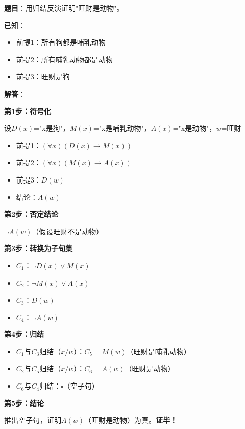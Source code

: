 \begin{examplebox}
\textbf{题目}：用归结反演证明"旺财是动物"。

已知：
\begin{itemize}[itemsep=0pt]
    \item 前提1：所有狗都是哺乳动物
    \item 前提2：所有哺乳动物都是动物
    \item 前提3：旺财是狗
\end{itemize}
\tcblower
\textbf{解答}：

\textbf{第1步：符号化}

设$D(x)$="x是狗"，$M(x)$="x是哺乳动物"，$A(x)$="x是动物"，$w$=旺财

\begin{itemize}[itemsep=0pt]
    \item 前提1：$(\forall x)(D(x) \to M(x))$
    \item 前提2：$(\forall x)(M(x) \to A(x))$
    \item 前提3：$D(w)$
    \item 结论：$A(w)$
\end{itemize}

\textbf{第2步：否定结论}

$\neg A(w)$（假设旺财不是动物）

\textbf{第3步：转换为子句集}
\begin{itemize}[itemsep=0pt]
    \item $C_1$：$\neg D(x) \lor M(x)$
    \item $C_2$：$\neg M(x) \lor A(x)$
    \item $C_3$：$D(w)$
    \item $C_4$：$\neg A(w)$
\end{itemize}

\textbf{第4步：归结}
\begin{itemize}[itemsep=0pt]
    \item $C_1$与$C_3$归结（$x/w$）：$C_5 = M(w)$（旺财是哺乳动物）
    \item $C_2$与$C_5$归结（$x/w$）：$C_6 = A(w)$（旺财是动物）
    \item $C_6$与$C_4$归结：$\square$（空子句）
\end{itemize}

\textbf{第5步：结论}

推出空子句，证明$A(w)$（旺财是动物）为真。\textbf{证毕！}
\end{examplebox}

